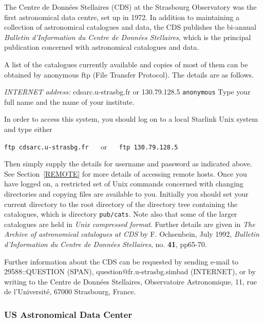 The Centre de Donn\'{e}es Stellaires (CDS) at the Strasbourg Observatory
was the first astronomical data centre, set up in 1972. In addition to 
maintaining a collection of astronomical catalogues and data, the CDS
publishes the bi-annual {\it Bulletin d'Information du Centre de 
Donn\'{e}es Stellaires}, which is the principal publication concerned
with astronomical catalogues and data.

A list of the catalogues currently available and copies of most of them
can be obtained by anonymous ftp (File Transfer Protocol). The details 
are as follows.

{\it INTERNET address: } cdsarc.u-strasbg.fr or 130.79.128.5
 \verb-anonymous-
 Type your full name and the name of your 
institute.

In order to access this system, you should log on to a local Starlink
Unix system and type either

\vspace{2.0 mm}
\verb:ftp cdsarc.u-strasbg.fr: ~~ or ~~ \verb:ftp 130.79.128.5:
\vspace{2.0 mm}

Then simply supply the details for username and password as indicated
above.  See Section~\ref{REMOTE} for more details of accessing remote 
hosts. Once you have logged on, a restricted set of Unix commands 
concerned with changing directories and copying files are available to 
you. Initially you should set your current directory to the root 
directory of the directory tree containing the catalogues, which is 
directory \verb-pub/cats-. Note also that some of the larger catalogues 
are held in {\it Unix compressed format}. Further details are given in 
{\it The Archive of astronomical catalogues at CDS} by F. Ochsenbein, 
July 1992, {\it Bulletin d'Information du Centre de Donn\'{e}es 
Stellaires}, no. {\bf 41}, pp65-70.

Further information about the CDS can be requested by sending e-mail
to 29588::QUESTION (SPAN), question@fr.u-strasbg.simbad (INTERNET), or 
by writing to the Centre de Donn\'{e}es Stellaires, Observatoire 
Astronomique, 11, rue de l'Universit\'{e}, 67000 Strasbourg, France.

\subsubsection{US Astronomical Data Center
\label{ADC}}

